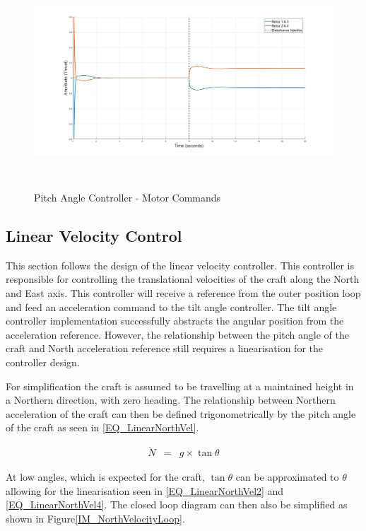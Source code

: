 		\begin{figure}[H]
			\centering
			\includegraphics[height = 8cm]{../Design/Matlab/Controllers/pitch_angle_impulse.jpg}
			\caption{Pitch Angle Controller -  Motor Commands}
			\label{IM_PitchAngleImpulse}
		\end{figure}
	
	\subsection{Linear Velocity Control}
	This section follows the design of the linear velocity controller. This controller is responsible for controlling the translational velocities of the craft along the North and East axis. This controller will receive a reference from the outer position loop and feed an acceleration command to the tilt angle controller. The tilt angle controller implementation successfully abstracts the angular position from the acceleration reference. However, the relationship between the pitch angle of the craft and North acceleration reference still requires a linearisation for the controller design. 
	
	For simplification the craft is assumed to be travelling at a maintained height in a Northern direction, with zero heading. The relationship between Northern acceleration of the craft can then be defined trigonometrically by the pitch angle of the craft as seen in \eqref{EQ_LinearNorthVel}. 
	
	\begin{eqnarray}
	\ddot{N} &=& g\times \tan \theta \label{EQ_LinearNorthVel}
	\end{eqnarray}

	At low angles, which is expected for the craft, $\tan \theta$ can be approximated to $\theta$ allowing for the linearisation seen in \eqref{EQ_LinearNorthVel2} and \eqref{EQ_LinearNorthVel4}. The closed loop diagram can then also be simplified as shown in Figure\ref{IM_NorthVelocityLoop}.
	
